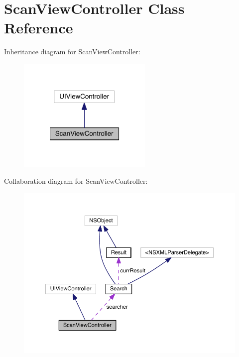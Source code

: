 \section{Scan\+View\+Controller Class Reference}
\label{interface_scan_view_controller}


Inheritance diagram for Scan\+View\+Controller\+:
\nopagebreak
\begin{figure}[H]
\begin{center}
\leavevmode
\includegraphics[width=182pt]{interface_scan_view_controller__inherit__graph}
\end{center}
\end{figure}


Collaboration diagram for Scan\+View\+Controller\+:
\nopagebreak
\begin{figure}[H]
\begin{center}
\leavevmode
\includegraphics[width=350pt]{interface_scan_view_controller__coll__graph}
\end{center}
\end{figure}
